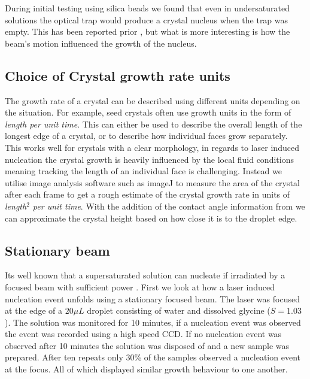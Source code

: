 During initial testing using silica beads we found that 
even in undersaturated solutions the optical trap would 
produce a crystal nucleus when the trap was empty. This 
has been reported prior \cite{Rungsimanon2010, Liao2022}, 
but what is more interesting is how the beam's motion 
influenced the growth of the nucleus. 

\subsection{Choice of Crystal growth rate units}
The growth rate of a crystal can be described using different
units depending on the situation. For example, seed crystals 
often use growth units in the form of \textit{length per unit
time}. This can either be used to describe the overall length
of the longest edge of a crystal, or to describe how individual
faces grow separately. This works well for crystals with a 
clear morphology, in regards to laser induced nucleation the 
crystal growth is heavily influenced by the local fluid 
conditions meaning tracking the length of an individual face 
is challenging. Instead we utilise image analysis software 
such as imageJ to measure the area of the crystal after each 
frame to get a rough estimate of the crystal growth rate in 
units of \textit{length$^2$ per unit time}. With the addition 
of the contact angle information from \cite{Flannigan2023} we 
can approximate the crystal height based on how close it is to 
the droplet edge.

\subsection{Stationary beam}
\label{sec:stationary}
Its well known that a supersaturated solution can nucleate
if irradiated by a focused beam with sufficient power 
\cite{Rungsimanon2010}. First we look at how a laser induced
nucleation event unfolds using a stationary focused beam. 
The laser was focused at the edge of a $20\mu L$ droplet 
consisting of water and dissolved glycine ($S=1.03$). The 
solution was monitored for 10 minutes, if a nucleation event 
was observed the event was recorded using a high speed CCD. 
If no nucleation event was observed after 10 minutes the 
solution was disposed of and a new sample was prepared. After 
ten repeats only 30\% of the samples observed a nucleation 
event at the focus. All of which displayed similar growth 
behaviour to one another.

